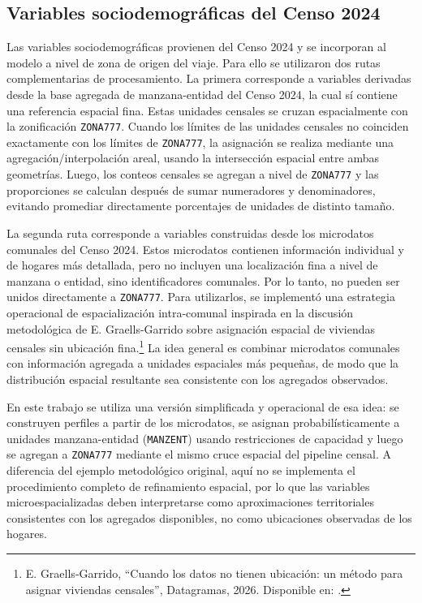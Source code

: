 \subsection{Variables sociodemográficas del Censo 2024}

Las variables sociodemográficas provienen del Censo 2024 y se incorporan al modelo a nivel de zona de origen del viaje. Para ello se utilizaron dos rutas complementarias de procesamiento. La primera corresponde a variables derivadas desde la base agregada de manzana-entidad del Censo 2024, la cual sí contiene una referencia espacial fina. Estas unidades censales se cruzan espacialmente con la zonificación \texttt{ZONA777}. Cuando los límites de las unidades censales no coinciden exactamente con los límites de \texttt{ZONA777}, la asignación se realiza mediante una agregación/interpolación areal, usando la intersección espacial entre ambas geometrías. Luego, los conteos censales se agregan a nivel de \texttt{ZONA777} y las proporciones se calculan después de sumar numeradores y denominadores, evitando promediar directamente porcentajes de unidades de distinto tamaño.

La segunda ruta corresponde a variables construidas desde los microdatos comunales del Censo 2024.
Estos microdatos contienen información individual y de hogares más detallada, pero no incluyen una
localización fina a nivel de manzana o entidad, sino identificadores comunales. Por lo tanto, no
pueden ser unidos directamente a \texttt{ZONA777}. Para utilizarlos, se implementó una estrategia
operacional de espacialización intra-comunal inspirada en la discusión metodológica de
E. Graells-Garrido sobre asignación espacial de viviendas censales sin ubicación fina.\footnote{
E. Graells-Garrido, ``Cuando los datos no tienen ubicación: un método para asignar viviendas
censales'', Datagramas, 2026. Disponible en:
.
}
La idea general es combinar microdatos comunales con información agregada a unidades espaciales más
pequeñas, de modo que la distribución espacial resultante sea consistente con los agregados
observados.

En este trabajo se utiliza una versión simplificada y operacional de esa idea: se construyen perfiles
a partir de los microdatos, se asignan probabilísticamente a unidades manzana-entidad
(\texttt{MANZENT}) usando restricciones de capacidad y luego se agregan a \texttt{ZONA777} mediante
el mismo cruce espacial del pipeline censal. A diferencia del ejemplo metodológico original, aquí no
se implementa el procedimiento completo de refinamiento espacial, por lo que las variables
microespacializadas deben interpretarse como aproximaciones territoriales consistentes con los
agregados disponibles, no como ubicaciones observadas de los hogares.

